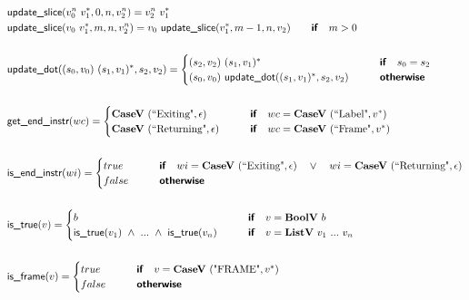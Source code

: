 \begin{align*}
  &\updateslice(v_0^n ~ \seq{v_1}, 0, n, v_2^n) = v_2^n ~ \seq{v_1} \\
  &\updateslice(v_0 ~ \seq{v_1}, m, n, v_2^n) =  v_0 ~ \updateslice(\seq{v_1}, m-1, n, v_2)
  \quad\quad\premise{if}\quad m > 0 \\
%
\newline \\
  &\updatedot((s_0, v_0) ~ \seq{(s_1, v_1)}, s_2, v_2) =
  \begin{cases}
    (s_2, v_2) ~ \seq{(s_1, v_1)}
    &\quad\quad\premise{if}\quad s_0 = s_2 \\
    (s_0, v_0) ~ \updatedot(\seq{(s_1, v_1)}, s_2, v_2)
    &\quad\quad\premise{otherwise}
  \end{cases}
  \\
%
\newline \\
  &\getendinstr(wc) =
  \begin{cases}
    \casev ~ (\text{``Exiting"}, \epsilon) &\quad\quad\premise{if}\quad wc = \casev ~ (\text{``Label"}, \seq v)\\
    \casev ~ (\text{``Returning"}, \epsilon) &\quad\quad\premise{if}\quad wc = \casev ~ (\text{``Frame"}, \seq v)
  \end{cases} \\
%
\newline \\
  &\isendinstr(wi) =
  \begin{cases}
    true &\quad\quad\premise{if}\quad wi = \casev ~ (\text{``Exiting"}, \epsilon) \quad\lor\quad wi = \casev ~ (\text{``Returning"}, \epsilon)\\
    false &\quad\quad\premise{otherwise}
  \end{cases} \\
%
\newline \\
  &\istrue(v) =
  \begin{cases}
  b &\quad\quad\premise{if}\quad v = \boolv ~ b \\
    \istrue(v_1) ~ \land ~ ... ~ \land ~ \istrue(v_n) &\quad\quad\premise{if}\quad
    v = \listv ~ v_1 ~ ... ~ v_n \\
  \end{cases} \\
%
\newline \\
  &\isframe(v) =
  \begin{cases}
    true
    &\quad\quad\premise{if}\quad v = \casev ~ (\text{"FRAME"}, \seq v) \\
    false &\quad\quad\premise{otherwise}\\
  \end{cases}
  \\
\end{align*}





